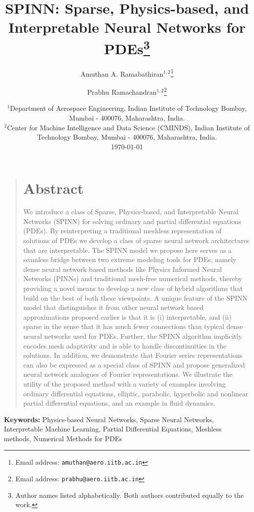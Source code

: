 \documentclass[12pt]{article}
\title{SPINN: Sparse, Physics-based, and Interpretable Neural Networks for PDEs\footnote{Author names listed alphabetically. Both authors contributed equally to the work.}}
\author{\textsf{Amuthan A. Ramabathiran}$^{1,2}$\footnote{Email address: \texttt{amuthan@aero.iitb.ac.in}} \and \textsf{Prabhu Ramachandran}$^{1,2}$\footnote{Email address: \texttt{prabhu@aero.iitb.ac.in}}}
\date{%
	$^1${\small Department of Aerospace Engineering, Indian Institute of Technology Bombay, Mumbai - 400076, Maharashtra, India.}\\[2ex]%
	$^2${\small Center for Machine Intelligence and Data Science (CMINDS), Indian Institute of Technology Bombay, Mumbai - 400076, Maharashtra, India.}\\[2ex]%
	\today
}
\newcommand{\new}[1]{#1}
\providecommand{\keywords}[1]{\textbf{\textsf{Keywords:}} #1}
\begin{document}
\maketitle

\begin{quote}
\section*{Abstract}
We introduce a class of Sparse, Physics-based, and Interpretable Neural Networks (SPINN) for solving ordinary and partial differential equations \new{(PDEs)}. By reinterpreting a traditional meshless representation of solutions of PDEs we develop a class of sparse neural network architectures that are interpretable. The SPINN model we propose here serves as a seamless bridge between two extreme modeling tools for PDEs, \new{namely} dense neural network based methods \new{like Physics Informed Neural Networks (PINNs)} and traditional mesh-free numerical methods, thereby providing a novel means to develop a new class of hybrid algorithms that build on the best of both these viewpoints. A unique feature of the SPINN model that distinguishes it from other neural network based approximations proposed earlier is that it is (i) interpretable, and (ii) sparse in the sense that it has much \new{fewer connections than typical dense neural networks used for PDEs.} Further, the SPINN algorithm implicitly encodes mesh adaptivity and is able to handle discontinuities in the solutions. In addition, we demonstrate that Fourier series representations can \new{also} be expressed as a special class of SPINN and propose generalized neural network analogues of Fourier representations. We illustrate the utility of the proposed method with a variety of examples involving ordinary differential equations, elliptic, parabolic, hyperbolic and nonlinear partial differential equations, and an example in fluid dynamics.
\end{quote}


\keywords{Physics-based Neural Networks, Sparse Neural Networks, Interpretable Machine Learning, Partial Differential Equations, Meshless methods, Numerical Methods for PDEs}

\end{document}
